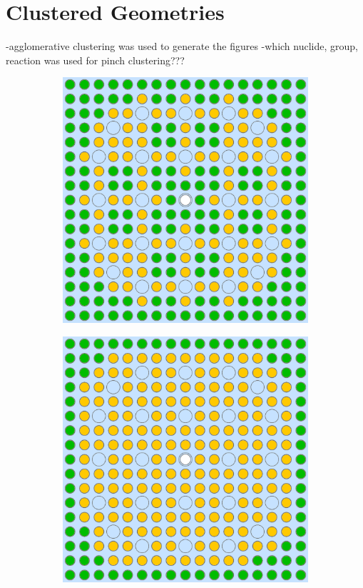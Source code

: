 \section{Clustered Geometries}
\label{sec:chap10-geometries}

-agglomerative clustering was used to generate the figures
-which nuclide, group, reaction was used for pinch clustering???

\begin{figure}[h!]
\centering
\begin{subfigure}{0.48\textwidth}
  \centering
  \includegraphics[width=0.9\linewidth]{figures/unsupervised/geometries/with-features/2-clusters/pinch/assm-16}
  \caption{}
  \label{fig:chap10-assm-16-pinch-2}
\end{subfigure}%
\begin{subfigure}{0.48\textwidth}
  \centering
  \includegraphics[width=0.9\linewidth]{figures/unsupervised/geometries/with-features/2-clusters/combined/assm-16}

\end{subfigure}
\end{figure}
